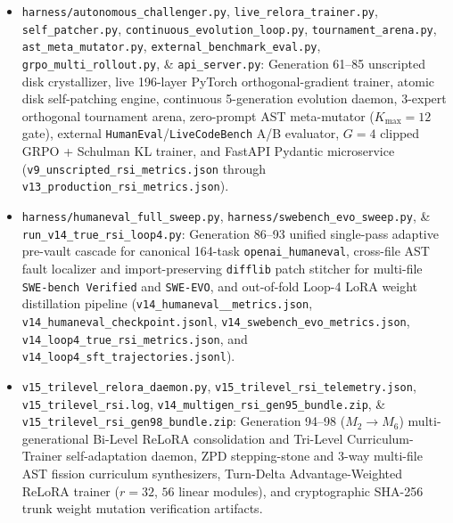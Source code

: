 \documentclass[10pt,twocolumn,letterpaper]{article}
\begin{document}
\begin{itemize}
    \item \texttt{harness/\allowbreak autonomous\_\allowbreak challenger.py}, \texttt{live\_\allowbreak relora\_\allowbreak trainer.py}, \texttt{self\_\allowbreak patcher.py}, \texttt{continuous\_\allowbreak evolution\_\allowbreak loop.py}, \texttt{tournament\_\allowbreak arena.py}, \texttt{ast\_\allowbreak meta\_\allowbreak mutator.py}, \texttt{external\_\allowbreak benchmark\_\allowbreak eval.py}, \texttt{grpo\_\allowbreak multi\_\allowbreak rollout.py}, \& \texttt{api\_\allowbreak server.py}: Generation 61--85 unscripted disk crystallizer, live 196-layer PyTorch orthogonal-gradient trainer, atomic disk self-patching engine, continuous 5-generation evolution daemon, 3-expert orthogonal tournament arena, zero-prompt AST meta-mutator ($K_{\max}=12$ gate), external \texttt{HumanEval}/\texttt{LiveCodeBench} A/B evaluator, $G=4$ clipped GRPO + Schulman KL trainer, and FastAPI Pydantic microservice (\texttt{v9\_\allowbreak unscripted\_\allowbreak rsi\_\allowbreak metrics.json} through \texttt{v13\_\allowbreak production\_\allowbreak rsi\_\allowbreak metrics.json}).
    \item \texttt{harness/\allowbreak humaneval\_\allowbreak full\_\allowbreak sweep.py}, \texttt{harness/\allowbreak swebench\_\allowbreak evo\_\allowbreak sweep.py}, \& \texttt{run\_\allowbreak v14\_\allowbreak true\_\allowbreak rsi\_\allowbreak loop4.py}: Generation 86--93 unified single-pass adaptive pre-vault cascade for canonical 164-task \texttt{openai\_humaneval}, cross-file AST fault localizer and import-preserving \texttt{difflib} patch stitcher for multi-file \texttt{SWE-bench Verified} and \texttt{SWE-EVO}, and out-of-fold Loop-4 LoRA weight distillation pipeline (\texttt{v14\_\allowbreak humaneval\_\_\allowbreak metrics.json}, \texttt{v14\_\allowbreak humaneval\_\allowbreak checkpoint.jsonl}, \texttt{v14\_\allowbreak swebench\_\allowbreak evo\_\allowbreak metrics.json}, \texttt{v14\_\allowbreak loop4\_\allowbreak true\_\allowbreak rsi\_\allowbreak metrics.json}, and \texttt{v14\_\allowbreak loop4\_\allowbreak sft\_\allowbreak trajectories.jsonl}).
    \item \texttt{v15\_\allowbreak trilevel\_\allowbreak relora\_\allowbreak daemon.py}, \texttt{v15\_\allowbreak trilevel\_\allowbreak rsi\_\allowbreak telemetry.json}, \texttt{v15\_\allowbreak trilevel\_\allowbreak rsi.log}, \texttt{v14\_\allowbreak multigen\_\allowbreak rsi\_\allowbreak gen95\_\allowbreak bundle.zip}, \& \texttt{v15\_\allowbreak trilevel\_\allowbreak rsi\_\allowbreak gen98\_\allowbreak bundle.zip}: Generation 94--98 ($M_{2}\to M_{6}$) multi-generational Bi-Level ReLoRA consolidation and Tri-Level Curriculum-Trainer self-adaptation daemon, ZPD stepping-stone and 3-way multi-file AST fission curriculum synthesizers, Turn-Delta Advantage-Weighted ReLoRA trainer ($r=32$, $56$ linear modules), and cryptographic SHA-256 trunk weight mutation verification artifacts.
\end{itemize}
\end{document}
